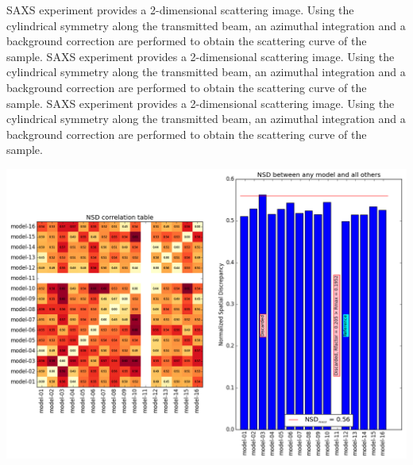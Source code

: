\documentclass[11pt]{article}
\begin{document}
\begin{minipage}{0.55\linewidth}
    SAXS experiment provides a 2-dimensional scattering image. 
    Using the cylindrical symmetry along the transmitted beam, an 
    azimuthal integration and a background correction are performed to 
    obtain the scattering curve of the sample. 
    SAXS experiment provides a 2-dimensional scattering image. 
    Using the cylindrical symmetry along the transmitted beam, an 
    azimuthal integration and a background correction are performed to 
    obtain the scattering curve of the sample. 
    SAXS experiment provides a 2-dimensional scattering image. 
    Using the cylindrical symmetry along the transmitted beam, an 
    azimuthal integration and a background correction are performed to 
    obtain the scattering curve of the sample. 

\end{minipage} \hfill
\begin{minipage}{0.4\linewidth}
    \begin{flushleft}
    \includegraphics[scale=0.4]{nsd.png}
    \end{flushleft}
\end{minipage}


\begin{center}
\end{center}
\end{document}
